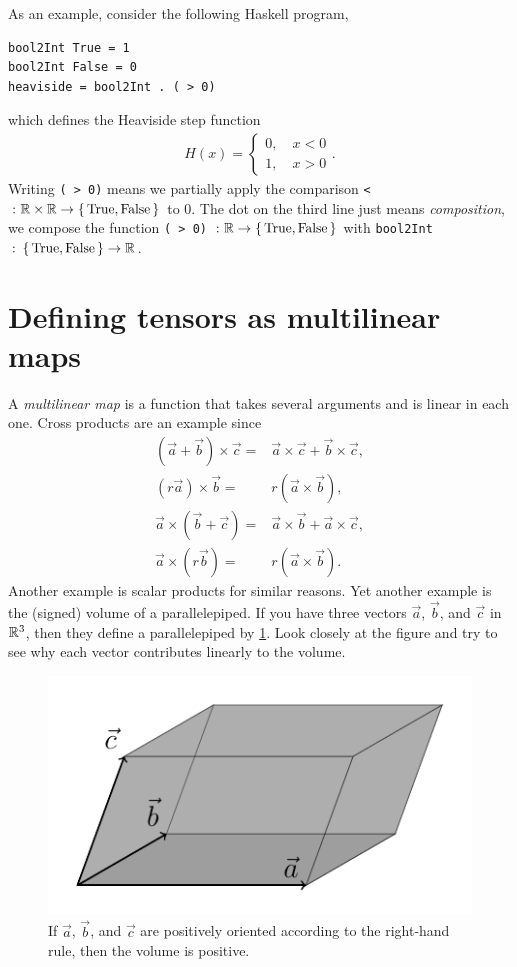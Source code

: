 \documentclass[english, 12pt]{article}
\begin{document}
As an example, consider the following Haskell program,
\begin{verbatim}
bool2Int True = 1
bool2Int False = 0
heaviside = bool2Int . ( > 0)
\end{verbatim}
which defines the Heaviside step function
\begin{align*}
	H(x) =
	\begin{cases}
		0, \quad x < 0\\
		1, \quad x > 0
	\end{cases}.
\end{align*}
Writing \verb|( > 0)| means we partially apply the comparison \verb|<|\(\colon \mathbb{R} \times \mathbb{R} \to \set{\textrm{True}, \textrm{False}}\) to \(0\).
The dot on the third line just means \emph{composition}, we compose the function \verb|( > 0)| \(\colon \mathbb{R} \to \set{\textrm{True}, \textrm{False}}\) with \verb|bool2Int|\(\colon \set{\textrm{True}, \textrm{False}} \to \mathbb{R}\).


\section{Defining tensors as multilinear maps}%
\label{sec:defining_tensors_as_multilinear_maps}

A \emph{multilinear map} is a function that takes several arguments and is linear in each one.
Cross products are an example since
\begin{align*}
	(\vec{a} + \vec{b}) \times \vec{c} ={}& \vec{a} \times \vec{c} + \vec{b} \times \vec{c},\\
	(r \vec{a}) \times \vec{b} ={}& r (\vec{a} \times \vec{b}),\\
	\vec{a} \times (\vec{b} + \vec{c}) ={}& \vec{a} \times \vec{b} + \vec{a} \times \vec{c},\\
	\vec{a} \times (r \vec{b}) ={}& r (\vec{a} \times \vec{b}).
\end{align*}
Another example is scalar products for similar reasons.
Yet another example is the (signed) volume of a parallelepiped.
If you have three vectors \(\vec a\), \(\vec b\), and \(\vec c\) in \(\mathbb{R}^3\), then they define a parallelepiped by \cref{fig:parallelepiped}.
Look closely at the figure and try to see why each vector contributes linearly to the volume.

\begin{figure}[ht]
	\centering
	\includegraphics[]{figures/parallelepiped.pdf}
	\caption{If \(\vec a\), \(\vec b\), and \(\vec c\) are positively oriented according to the right-hand rule, then the volume is positive.}%
	\label{fig:parallelepiped}
\end{figure}
\end{document}
